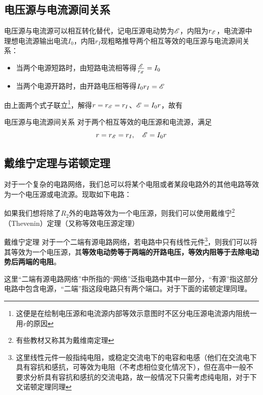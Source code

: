 \subsection{电压源与电流源间关系}
\label{dyydlygx}

电压源与电流源可以相互转化替代，记电压源电动势为$\mathscr{E}$，内阻为$r_{\mathscr{E}}$，电流源中理想电流源输出电流$I_0$，内阻$r_I$现粗略推导两个相互等效的电压源与电流源间关系：

\begin{itemize}
\item 当两个电源短路时，由短路电流相等得$\frac{\mathscr{E}}{r_{\mathscr{E}}} = I_0$
\item 当两个电源开路时，由开路电压相等得$I_0 r_I = \mathscr{E}$
\end{itemize}

由上面两个式子联立\footnote{这便是在绘制电压源和电流源内部等效示意图时不区分电压源电流源内阻统一用$r$的原因}，解得$r = r_{\mathscr{E}} = r_{I}$、$\mathscr{E} = I_0 r $，故有

\begin{theo}{电压源与电流源间关系}{}
对于两个相互等效的电压源和电流源，满足
$$r = r_{\mathscr{E}} = r_{I} ,\quad \mathscr{E} = I_0 r$$
\end{theo}

\subsection{戴维宁定理与诺顿定理}

对于一个复杂的电路网络，我们总可以将某个电阻或者某段电路外的其他电路等效为一个电压源或电流源。现取如下电路：



如果我们想将除了$R_2$外的电路等效为一个电压源，则我们可以使用戴维宁\footnote{有些教材又称其为戴维南定理}（Thevenin）定理（又称等效电压源定理）

\begin{theo}[label=dwndl]{戴维宁定理}{}
对于一个二端有源电路网络，若电路中只有线性元件\footnote{这里线性元件一般指纯电阻，或稳定交流电下的电容和电感（他们在交流电下具有容抗和感抗，可等效为电阻（不考虑相位变化情况下），但在高中一般不要求分析具有容抗和感抗的交流电路，故一般情况下只需考虑纯电阻，对于下文诺顿定理同理}，则我们可以将其等效为一个电压源，其\textbf{等效电动势等于两端的开路电压，等效内阻等于去除电动势后两端的电阻}。

这里“二端有源电路网络”中所指的“网络”泛指电路中其中一部分，“有源”指这部分电路中包含电源，“二端”指这段电路只有两个端口。对于下面的诺顿定理同理。
\end{theo}

